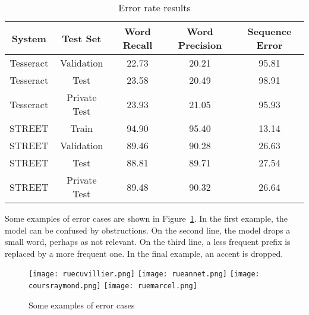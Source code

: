 \documentclass[runningheads]{llncs}
\begin{document}
\begin{table}
\begin{center}
\caption{Error rate results}
\label{table:results}
{\scriptsize
\begin{tabulary}{\linewidth}{| C | C | C | C | C |}
\hline
System & Test Set   & Word Recall & Word Precision & Sequence Error \\ \hline \hline 
Tesseract        & Validation & 22.73       & 20.21          & 95.81 \\ \hline 
Tesseract        & Test       & 23.58       & 20.49          & 98.91 \\ \hline 
Tesseract    & Private Test   & 23.93       & 21.05          & 95.93 \\ \hline 
\hline
STREET        & Train      & 94.90       & 95.40          & 13.14 \\ \hline 
STREET        & Validation & 89.46       & 90.28          & 26.63 \\ \hline 
STREET        & Test       & 88.81       & 89.71          & 27.54 \\ \hline 
STREET    & Private Test   & 89.48       & 90.32          & 26.64 \\ \hline 
\end{tabulary} 
}
\end{center} 
\end{table}
Some examples of error cases are shown in Figure~\ref{fig:error_cases}.
In the first example, the model can be confused by obstructions.
On the second line, the model drops a small word, perhaps as not relevant.
On the third line, a less frequent prefix is replaced by a more frequent one.
In the final example, an accent is dropped.
\begin{figure}
\centering
\texttt{[image: ruecuvillier.png]}
\texttt{[image: rueannet.png]}
\texttt{[image: coursraymond.png]}
\texttt{[image: ruemarcel.png]}
\caption{Some examples of error cases}
\label{fig:error_cases}
\end{figure}
\end{document}
